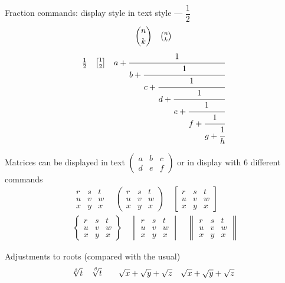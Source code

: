 \documentclass[12pt,a4paper]{article}
\theoremstyle{clearprint}
\begin{document}
\noindent
Fraction commands: display style in text style --- $\dfrac{1}{2}$
\newcommand{\testfrac}[2]{\genfrac{[}{]}{0pt}{1}{#1}{#2}}
\begin{equation}
\binom{n}{k} \quad \tbinom{n}{k} 
\end{equation}
\begin{equation}
\tfrac{1}{2} \quad \testfrac{1}{2} \quad  
a + \cfrac{1}{b + \cfrac{1}{c + \cfrac{1}{d + \cfrac{1}{e + \cfrac{1}{f + \cfrac{1}{g + \cfrac{1}{h}}}}}}}
\end{equation}

\noindent
Matrices can be displayed in text $\left(\begin{smallmatrix} a & b & c \\ d & e & f\end{smallmatrix}\right)$ or in display with 6 different commands
\begin{eqnarray*}
&&\begin{matrix} r & s & t \\ u & v & w \\ x & y & x\end{matrix}\quad
\begin{pmatrix} r & s & t \\ u & v & w \\ x & y & x\end{pmatrix}\quad
\begin{bmatrix} r & s & t \\ u & v & w \\ x & y & x\end{bmatrix}\\
&&\begin{Bmatrix} r & s & t \\ u & v & w \\ x & y & x\end{Bmatrix}\quad
\begin{vmatrix} r & s & t \\ u & v & w \\ x & y & x\end{vmatrix}\quad
\begin{Vmatrix} r & s & t \\ u & v & w \\ x & y & x\end{Vmatrix}\quad
\end{eqnarray*}

\noindent
Adjustments to roots (compared with the usual)
\begin{equation}
\sqrt[\beta]{t}\quad\sqrt[\leftroot{-1}\uproot{3}\beta]{t}\qquad \sqrt{x} + \sqrt{\smash[b]{y}} + \sqrt{z} \quad \sqrt{x} + \sqrt{y} + \sqrt{z}
\end{equation}
\end{document}
